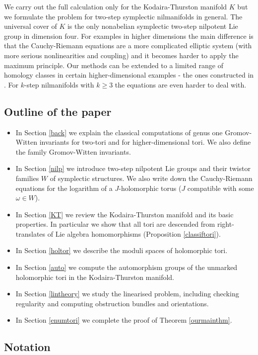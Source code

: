 \documentclass[11pt]{amsart}
\newcommand{\WW}{W}
\numberwithin{equation}{section}
\theoremstyle{definition}
\theoremstyle{remark}
\begin{document}
We carry out the full calculation only for the Kodaira-Thurston manifold $K$ but we formulate the problem for two-step symplectic nilmanifolds in general. The universal cover of $K$ is the only nonabelian symplectic two-step nilpotent Lie group in dimension four. For examples in higher dimensions the main difference is that the Cauchy-Riemann equations are a more complicated elliptic system (with more serious nonlinearities and coupling) and it becomes harder to apply the maximum principle. Our methods can be extended to a limited range of homology classes in certain higher-dimensional examples - the ones constructed in \cite{CFL}. For $k$-step nilmanifolds with $k\geq 3$ the equations are even harder to deal with.

\subsection*{Outline of the paper}
\begin{itemize}
\item In Section \ref{back} we explain the classical computations of genus one Gromov-Witten invariants for two-tori and for higher-dimensional tori. We also define the family Gromov-Witten invariants.
\item In Section \ref{nilp} we introduce two-step nilpotent Lie groups and their twistor families $\WW$ of symplectic structures. We also write down the Cauchy-Riemann equations for the logarithm of a $J$-holomorphic torus ($J$ compatible with some $\omega\in\WW$).
\item In Section \ref{KT} we review the Kodaira-Thurston manifold and its basic properties. In particular we show that all tori are descended from right-translates of Lie algebra homomorphisms (Proposition \ref{classiftori}).
\item In Section \ref{holtor} we describe the moduli spaces of holomorphic tori.
\item In Section \ref{auto} we compute the automorphism groups of the unmarked holomorphic tori in the Kodaira-Thurston manifold.
\item In Section \ref{lintheory} we study the linearised problem, including checking regularity and computing obstruction bundles and orientations.
\item In Section \ref{enumtori} we complete the proof of Theorem \ref{ourmainthm}.
\end{itemize}


\subsection*{Notation}
\end{document}
